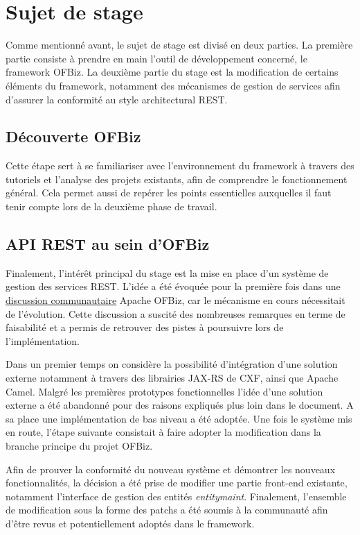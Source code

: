 \section{Sujet de stage }
Comme mentionné avant, le sujet de stage est divisé en deux parties. La première partie consiste à prendre en main l'outil de développement concerné, le framework OFBiz. La deuxième partie du stage est la modification de certains éléments du framework, notamment des mécanismes de gestion de services afin d'assurer la conformité au style architectural REST.  

\subsection{Découverte OFBiz}
Cette étape sert à se familiariser avec l'environnement du framework à travers des tutoriels et l'analyse des projets existants, afin de comprendre le fonctionnement général. Cela permet aussi de repérer les points essentielles auxquelles il faut tenir compte lors de la deuxième phase de travail. 

\subsection{API REST au sein d'OFBiz}

Finalement, l'intérêt principal du stage est la mise en place d'un système de gestion des services REST. L'idée a été évoquée pour la première fois dans une \href{https://issues.apache.org/jira/browse/OFBIZ-4274}{discussion communautaire} Apache OFBiz, car le mécanisme en cours nécessitait de l'évolution. Cette discussion a suscité des nombreuses remarques en terme de faisabilité et a permis de retrouver des pistes à poursuivre lors de l'implémentation.  

Dans un premier temps on considère la possibilité d'intégration d'une solution externe notamment à travers des librairies JAX-RS de CXF, ainsi que Apache Camel. Malgré les premières prototypes fonctionnelles l'idée d'une solution externe a été abandonné pour des raisons expliqués plus loin dans le document. A sa place une implémentation de bas niveau a été adoptée. Une fois le système mis en route, l'étape suivante consistait à faire adopter la modification dans la branche principe du projet OFBiz. 

Afin de prouver la conformité du nouveau système et démontrer les nouveaux fonctionnalités, la décision a été prise de modifier une partie front-end existante, notamment l'interface de gestion des entités \emph{entitymaint}. Finalement, l'ensemble de modification sous la forme des patchs a été soumis à la communauté afin d'être revus et potentiellement adoptés dans le framework. 









